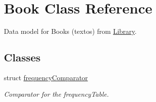 \hypertarget{class_book}{\section{Book Class Reference}
\label{class_book}
}


Data model for Books (textos) from \hyperlink{class_library}{Library}.  


\subsection*{Classes}
\begin{DoxyCompactItemize}
\item 
struct \hyperlink{struct_book_1_1frequency_comparator}{frequency\-Comparator}
\begin{DoxyCompactList}\small\item\em Comparator for the frequency\-Table. \end{DoxyCompactList}\end{DoxyCompactItemize}
